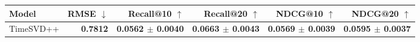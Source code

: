 \begin{tabular}{lrrrrr}
\toprule
Model & RMSE $\downarrow$ & Recall@10 $\uparrow$ & Recall@20 $\uparrow$ & NDCG@10 $\uparrow$ & NDCG@20 $\uparrow$ \\
\midrule
TimeSVD++ & \textbf{0.7812} & \textbf{0.0562 $\pm$ 0.0040} & \textbf{0.0663 $\pm$ 0.0043} & \textbf{0.0569 $\pm$ 0.0039} & \textbf{0.0595 $\pm$ 0.0037} \\
\bottomrule
\end{tabular}
